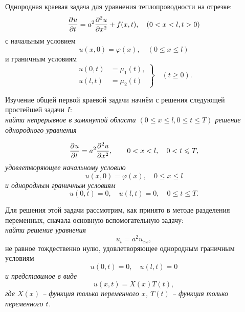 \setcounter{equation}{0}
Однородная краевая задача для уравнения теплопроводности на отрезке:
\begin{equation}
	\frac{\partial^{}u}{\partial t^{}} = a^2 \frac{\partial^{2}u}{\partial x^{2}} + f(x, t), \quad (0 < x <l, t > 0)
	\label{equ:HeatEqu}
\end{equation}
с начальным условием 
\begin{equation}
	u(x, 0) = \varphi(x), \quad (0 \leqslant x \leqslant l)
	\label{equ:HeatStartCond}
\end{equation}
и граничным условиям 
\begin{equation}
	\left.
	\begin{aligned}
		u(0, t) &= \mu_1 (t),\\
		u(l, t) &= \mu_2 (t)
	\end{aligned}
	\right\} \quad
	(t \geqslant 0).
	\label{equ:HeatBorderCond}
\end{equation}

Изучение общей первой краевой задачи начнём с решения следующей простейшей задачи $I$:\\
	\textit{найти непрерывное в замкнутой области $(0 \leqslant x \leqslant l, 0 \leqslant t \leqslant T)$ решение однородного уравнения}

\begin{equation}
	\frac{\partial^{}u}{\partial t^{}} = a^2 \frac{\partial^{2}u}{\partial x^{2}}, \qquad 0 < x < l,\quad  0 < t \leqslant T,
	\label{equ:equHeatEquSimp}
\end{equation}
\textit{удовлетворяющее начальному условию}
\begin{equation}
	u(x, 0) = \varphi (x), \quad 0 \leqslant x \leqslant l
	\label{equ:equHeatEquSimpStartCond}
\end{equation}
\textit{и однородным граничным условиям}
\begin{equation}
	u(0, t) = 0, \quad u(l, t) = 0, \quad 0 \leqslant t \leqslant T.
	\label{equ:equHeatEquSimpBorderCond}
\end{equation}

Для решения этой задачи рассмотрим, как принято в методе разделения переменных, сначала основную вспомогательную задачу:\\
\textit{найти решение уравнения}
\[
	u_t = a^2 u_{xx},
\]
не равное тождественно нулю, удовлетворяющее однородным граничным условиям
\begin{equation}
	u(0, t) = 0, \quad u(l, t) = 0 
	\label{equ:equHeatEqu2Border}
\end{equation}
\textit{и представимое в виде}
\begin{equation}
	u(x, t) = X(x) T(t),
	\label{equ:equHeatEquFourierView}
\end{equation}
\textit{где $X(x)$ -- функция только переменного $x$, $T(t)$ -- функция только переменного $t$.}

